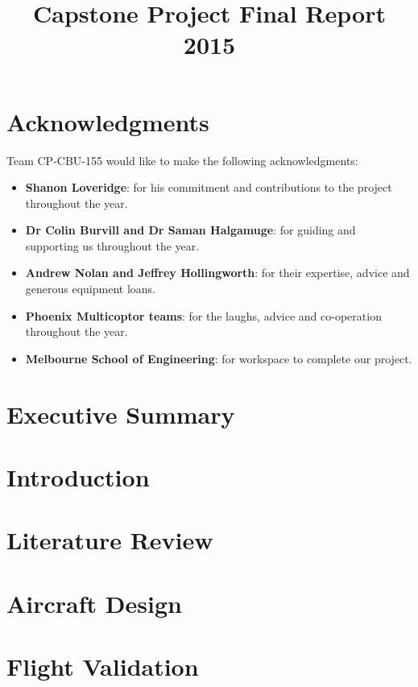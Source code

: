 \documentclass{article}
\title{Capstone Project
	  \vfill
	Final Report
	\vfill
	2015}
\author{}
\date{}
\begin{document}
	


\newpage

\section*{Acknowledgments}
Team CP-CBU-155 would like to make the following acknowledgments:
\begin{itemize}
	\item \textbf{Shanon Loveridge}: for his commitment and contributions to the project throughout the year.
	\item \textbf{Dr Colin Burvill and Dr Saman Halgamuge}: for guiding and supporting us throughout the year.
	\item \textbf{Andrew Nolan and Jeffrey Hollingworth}: for their expertise, advice and generous equipment loans.
	\item \textbf{Phoenix Multicoptor teams}: for the laughs, advice and co-operation throughout the year.
	\item \textbf{Melbourne School of Engineering}: for workspace to complete our project.
\end{itemize}



\newpage

\section{Executive Summary}


\newpage

\section{Introduction}


\section{Literature Review}


\section{Aircraft Design}


\section{Flight Validation}

\end{document}
